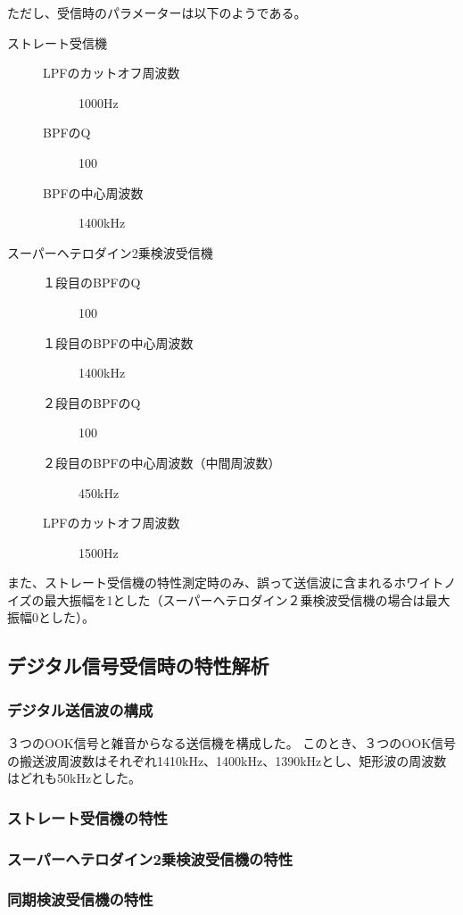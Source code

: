 \documentclass[11pt]{ltjsarticle}
\begin{document}
			ただし、受信時のパラメーターは以下のようである。
			\begin{description}
				\item[ストレート受信機] \mbox{}
					\begin{description}
						\item[LPFのカットオフ周波数] 1000Hz
						\item[BPFのQ] 100
						\item[BPFの中心周波数] 1400kHz
					\end{description}
				\item[スーパーヘテロダイン2乗検波受信機] \mbox{}
					\begin{description}
						\item[１段目のBPFのQ] 100
						\item[１段目のBPFの中心周波数] 1400kHz
						\item[２段目のBPFのQ] 100
						\item[２段目のBPFの中心周波数（中間周波数）] 450kHz
						\item[LPFのカットオフ周波数] 1500Hz
					\end{description}
			\end{description}
			また、ストレート受信機の特性測定時のみ、誤って送信波に含まれるホワイトノイズの最大振幅を1とした（スーパーヘテロダイン２乗検波受信機の場合は最大振幅0とした）。

	\subsection{デジタル信号受信時の特性解析}
		\subsubsection{デジタル送信波の構成}
			３つのOOK信号と雑音からなる送信機を構成した。
			このとき、３つのOOK信号の搬送波周波数はそれぞれ1410kHz、1400kHz、1390kHzとし、矩形波の周波数はどれも50kHzとした。
		\subsubsection{ストレート受信機の特性}
		\subsubsection{スーパーヘテロダイン2乗検波受信機の特性}
		\subsubsection{同期検波受信機の特性}
\end{document}
